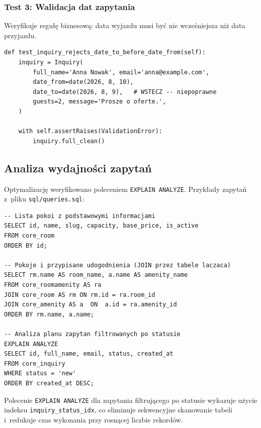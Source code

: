 \documentclass[12pt,a4paper]{article}
\begin{document}
\subsubsection*{Test 3: Walidacja dat zapytania}

Weryfikuje regułę biznesową: data wyjazdu musi być nie wcześniejsza niż
data przyjazdu.

\begin{lstlisting}[style=pythonstyle, caption={test\_inquiry\_rejects\_date\_to\_before\_date\_from}]
def test_inquiry_rejects_date_to_before_date_from(self):
    inquiry = Inquiry(
        full_name='Anna Nowak', email='anna@example.com',
        date_from=date(2026, 8, 10),
        date_to=date(2026, 8, 9),   # WSTECZ -- niepoprawne
        guests=2, message='Prosze o oferte.',
    )

    with self.assertRaises(ValidationError):
        inquiry.full_clean()
\end{lstlisting}

\subsection{Analiza wydajności zapytań}

Optymalizację weryfikowano poleceniem \texttt{EXPLAIN ANALYZE}.
Przykłady zapytań z~pliku \texttt{sql/queries.sql}:

\begin{lstlisting}[style=sqlstyle, caption={Przykładowe zapytania SQL}]
-- Lista pokoi z podstawowymi informacjami
SELECT id, name, slug, capacity, base_price, is_active
FROM core_room
ORDER BY id;

-- Pokoje i przypisane udogodnienia (JOIN przez tabele laczaca)
SELECT rm.name AS room_name, a.name AS amenity_name
FROM core_roomamenity AS ra
JOIN core_room AS rm ON rm.id = ra.room_id
JOIN core_amenity AS a  ON  a.id = ra.amenity_id
ORDER BY rm.name, a.name;

-- Analiza planu zapytan filtrowanych po statusie
EXPLAIN ANALYZE
SELECT id, full_name, email, status, created_at
FROM core_inquiry
WHERE status = 'new'
ORDER BY created_at DESC;
\end{lstlisting}

Polecenie \texttt{EXPLAIN ANALYZE} dla zapytania filtrującego po statusie
wykazuje użycie indeksu \texttt{inquiry\_status\_idx}, co eliminuje
sekwencyjne skanowanie tabeli i~redukuje czas wykonania przy rosnącej
liczbie rekordów.

\end{document}
